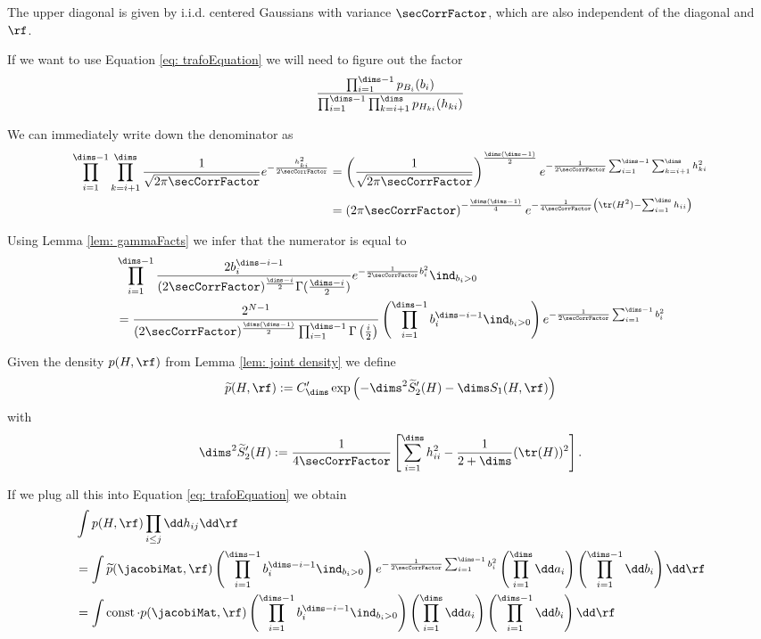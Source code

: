 The upper diagonal is given by i.i.d. centered Gaussians with variance $\secCorrFactor$, which are also independent of the diagonal and $\rf$.

If we want to use Equation \ref{eq: trafoEquation} we will need to figure out the factor
$$ \frac{\prod_{i=1}^{\dims-1} p_{B_i}(b_i)}{\prod_{i=1}^{\dims-1}\prod_{k=i+1}^{\dims} p_{H_{k i}}(h_{k i})} $$

We can immediately write down the denominator as 
\begin{align*}
    \prod_{i=1}^{\dims-1}\prod_{k=i+1}^{\dims} \frac{1}{\sqrt{2\pi\secCorrFactor}} e^{-\frac{h_{ki}^2}{2\secCorrFactor}}
    & = \left( \frac{1}{\sqrt{2\pi\secCorrFactor}} \right)^{\frac{\dims(\dims-1)}{2}} e^{-\frac{1}{2\secCorrFactor} \sum_{i=1}^{\dims-1}\sum_{k=i+1}^{\dims} h_{ki}^2} \\
    & = \left( 2\pi\secCorrFactor \right)^{-\frac{\dims(\dims-1)}{4}} e^{-\frac{1}{4\secCorrFactor} \left( \tr(H^2) - \sum_{i=1}^\dims h_{ii} \right)}
\end{align*}

Using Lemma \ref{lem: gammaFacts} we infer that the numerator is equal to
\begin{align*}
    & \prod_{i=1}^{\dims-1} \frac{2 b_i^{\dims-i-1}}{(2\secCorrFactor)^{\frac{\dims-i}{2}}\Gamma(\frac{\dims-i}{2})}  e^{-\frac{1}{2\secCorrFactor} b_i^2} \ind_{b_i>0} \\
    & = \frac{2^{N-1}}{(2\secCorrFactor)^{\frac{\dims(\dims-1)}{2}} \prod_{i=1}^{\dims-1} \Gamma\left(\frac{i}{2}\right)} \left(\prod_{i=1}^{\dims-1} b_i^{\dims-i-1} \ind_{b_i>0} \right)
    e^{-\frac{1}{2\secCorrFactor}\sum_{i=1}^{\dims-1} b_i^2}
\end{align*}

Given the density $p(H,\rf)$ from Lemma \ref{lem: joint density} we define 
\begin{align*}
    \widetilde{p}(H,\rf):= C_\dims' \exp\left( -\dims^2 \widetilde{S}_2'(H) - \dims S_1(H,\rf) \right)
\end{align*}
with
\begin{align*}
    \dims^2\widetilde{S}_2'(H) := \frac{1}{4 \secCorrFactor} \left[ \sum_{i=1}^\dims h_{ii}^2 - \frac{1}{2+\dims} (\tr(H))^2 \right].
\end{align*}

If we plug all this into Equation \ref{eq: trafoEquation} we obtain
\begin{align*}
    & \int p(H,\rf) \prod_{i\leq j} \dd h_{ij} \dd \rf \\
    & = \int \widetilde{p}(\jacobiMat,\rf) \left(\prod_{i=1}^{\dims-1} b_i^{\dims-i-1} \ind_{b_i>0} \right) e^{-\frac{1}{2\secCorrFactor}\sum_{i=1}^{\dims-1} b_i^2} \left(\prod_{i=1}^{\dims} \dd a_{i}\right) \left(\prod_{i=1}^{\dims-1} \dd b_{i}\right) \dd \rf
    \\
    & = \int \operatorname{const} \cdot p(\jacobiMat,\rf) \left(\prod_{i=1}^{\dims-1} b_i^{\dims-i-1} \ind_{b_i>0} \right) \left(\prod_{i=1}^{\dims} \dd a_{i}\right) \left(\prod_{i=1}^{\dims-1} \dd b_{i}\right) \dd \rf
\end{align*}

